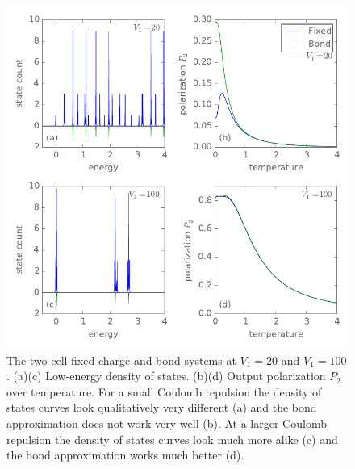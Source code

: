 \begin{figure}
  \center
  \includegraphics{bond_approximation2}
  \caption{
  The two-cell fixed charge and bond systems at $V_1 = 20$ and $V_1 = 100$.
  (a)(c) Low-energy density of states. (b)(d) Output polarization $P_2$ over
  temperature. For a small Coulomb repulsion the density of states curves look
  qualitatively very different (a) and the bond approximation does not work very
  well (b). At a larger Coulomb repulsion the density of states curves look much
  more alike (c) and the bond approximation works much better (d).
  }
  \label{fig:bond_approximation2}
\end{figure}
%


